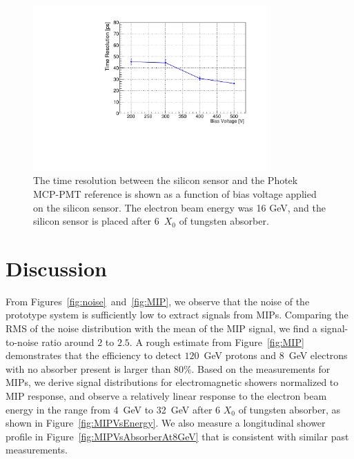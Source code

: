 \documentclass[preprint,1p]{elsarticle}
\begin{document}
\begin{figure}[htbp] 
\centering
\includegraphics[width=0.8\textwidth]{plots/SigmaT_vs_DV_lin30Stamp.pdf} 
\caption{The time resolution between the silicon sensor and the Photek MCP-PMT 
reference is shown as a function of bias voltage applied on the silicon sensor. The electron beam
energy was 16 GeV, and the silicon sensor is placed
after 6~$X_0$ of tungsten absorber.} 
\label{fig:SigmaT_vs_DV_lin30Stamp} 
\end{figure} 

\section{Discussion} 
\label{sec:discussion} 

From Figures~\ref{fig:noise}~and~\ref{fig:MIP}, we observe that the noise of the
prototype system is sufficiently low to extract signals from MIPs. Comparing the
RMS of the noise distribution with the mean of the MIP signal, we find a
signal-to-noise ratio around $2$ to $2.5$. A rough estimate from
Figure~\ref{fig:MIP} demonstrates that the efficiency to detect $120$~GeV
protons and $8$~GeV electrons with no absorber present is larger than $80\%$.
Based on the measurements for MIPs, we derive signal distributions for
electromagnetic showers normalized to MIP response, and observe a relatively
linear response to the electron beam energy in the range from 4~GeV to 32~GeV
after 6 $X_0$ of tungsten absorber, as shown in Figure~\ref{fig:MIPVsEnergy}. We also
measure a longitudinal shower profile in Figure~\ref{fig:MIPVsAbsorberAt8GeV}
that is consistent with similar past measurements.
\end{document}
